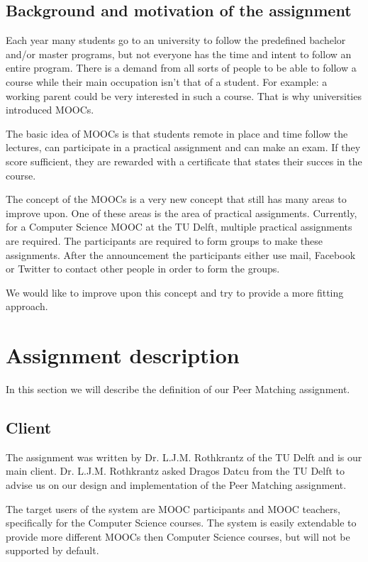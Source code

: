 \documentclass[]{article}
\begin{document}
\subsection{Background and motivation of the assignment}
Each year many students go to an university to follow the predefined bachelor and/or master programs, but not everyone has the time and intent to follow an entire program.
There is a demand from all sorts of people to be able to follow a course while their main occupation isn't that of a student.
For example: a working parent could be very interested in such a course.
That is why universities introduced MOOCs.

The basic idea of MOOCs is that students remote in place and time follow the lectures, can participate in a practical assignment and can make an exam.
If they score sufficient, they are rewarded with a certificate that states their succes in the course.

The concept of the MOOCs is a very new concept that still has many areas to improve upon.
One of these areas is the area of practical assignments.
Currently, for a Computer Science MOOC at the TU Delft, multiple practical assignments are required.
The participants are required to form groups to make these assignments.
After the announcement the participants either use mail, Facebook or  Twitter to contact other people in order to form the groups.

We would like to improve upon this concept and try to provide a more fitting approach.
\section{Assignment description}
In this section we will describe the definition of our Peer Matching assignment.

\subsection{Client}
The assignment was written by Dr. L.J.M. Rothkrantz of the TU Delft and is our main client.
Dr. L.J.M. Rothkrantz asked Dragos Datcu from the TU Delft to advise us on our design and implementation of the Peer Matching assignment.

The target users of the system are MOOC participants and MOOC teachers, specifically for the Computer Science courses. The system is easily extendable to provide more different MOOCs then Computer Science courses, but will not be supported by default.
\end{document}
